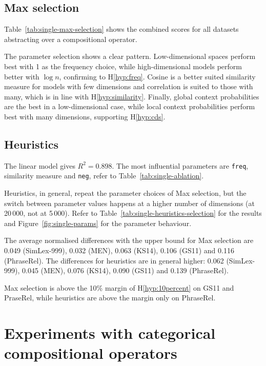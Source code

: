 \subsection{Max selection}
\label{sec:max-selection-single}

Table~\ref{tab:single-max-selection} shows the combined scores for all datasets abstracting over a compositional operator.

The parameter selection shows a clear pattern. Low-dimensional spaces perform best with 1 as the frequency choice, while high-dimensional models perform better with $\log n$, confirming to H\ref{hyp:freq}. Cosine is a better suited similarity measure for models with few dimensions and correlation is suited to those with many, which is in line with H\ref{hyp:similarity}. Finally, global context probabilities are the best in a low-dimensional case, while local context probabilities perform best with many dimensions, supporting H\ref{hyp:cds}.

\subsection{Heuristics}
\label{sec:heuristics-single}



The linear model gives $R^2 = 0.898$. The most influential parameters are \texttt{freq}, similarity measure and \texttt{neg}, refer to Table~\ref{tab:single-ablation}.

Heuristics, in general, repeat the parameter choices of Max selection, but the switch between parameter values happens at a higher number of dimensions (at 20\,000, not at 5\,000). Refer to Table~\ref{tab:single-heuristics-selection} for the results and Figure~\ref{fig:single-params} for the parameter behaviour.

The average normalised differences with the upper bound for Max selection are 0.049 (SimLex-999), 0.032 (MEN), 0.063 (KS14), 0.106 (GS11) and 0.116 (PhraseRel). The differences for heuristics are in general higher: 0.062 (SimLex-999), 0.045 (MEN), 0.076 (KS14), 0.090 (GS11) and 0.139 (PhraseRel).

Max selection is above the 10\% margin of H\ref{hyp:10percent} on GS11 and PraseRel, while heuristics are above the margin only on PhraseRel.

\section{Experiments with categorical compositional operators}
\label{sec:frob-comp-oper}

